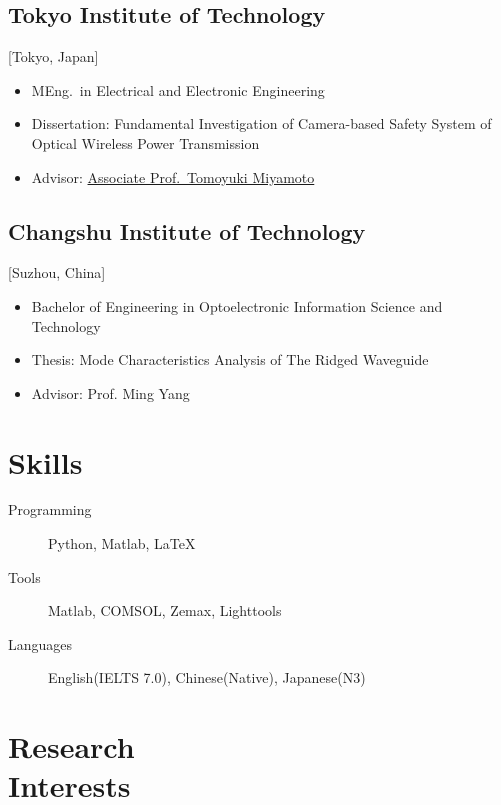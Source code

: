 \documentclass{mycv}
\begin{document}
\subsection{Tokyo Institute of Technology}[Tokyo, Japan]
\vspace{-\parskip}%
\begin{itemize}[label={}]	
  \item MEng.\ in Electrical and Electronic Engineering 
  \item Dissertation: {Fundamental Investigation of Camera-based Safety System of Optical Wireless Power Transmission} %
  \item Advisor: \href{https://www.first.iir.titech.ac.jp/member/core3.html#miyamoto}{Associate Prof.~Tomoyuki Miyamoto}
\end{itemize}

\subsection{Changshu Institute of Technology}[Suzhou, China]
\vspace{-\parskip}%
\begin{itemize}[label={}]
  \item Bachelor of Engineering in Optoelectronic Information Science and Technology  \\ 
  \item Thesis: {Mode Characteristics Analysis of The Ridged Waveguide}
  \item Advisor: Prof. Ming Yang
\end{itemize}

\section{Skills}

\begin{description}
  \item[Programming] Python, Matlab, \LaTeX
  \item[Tools] Matlab, COMSOL, Zemax, Lighttools
  \item[Languages] English(IELTS 7.0), Chinese(Native), Japanese(N3)
\end{description}

\section{Research \\ Interests}
\end{document}
